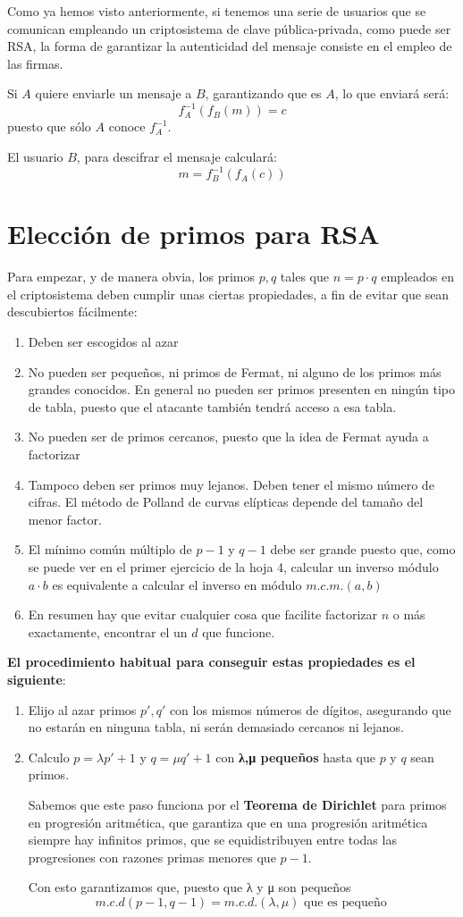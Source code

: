 Como ya hemos visto anteriormente, si tenemos una serie de usuarios que se comunican empleando un criptosistema de clave pública-privada, como puede ser RSA, la forma de garantizar la autenticidad del mensaje consiste en el empleo de las firmas.

Si $A$ quiere enviarle un mensaje a $B$, garantizando que es $A$, lo que enviará será:
\[f_A^{-1}\left(f_B(m)\right) = c\]
puesto que sólo $A$ conoce $f^{-1}_A$.

El usuario $B$, para descifrar el mensaje calculará:
\[m = f_B^{-1}\left(f_A(c)\right)\]

\section{Elección de primos para RSA}

Para empezar, y de manera obvia, los primos $p,q$ tales que $n=p\cdot q$ empleados en el criptosistema deben cumplir unas ciertas propiedades, a fin de evitar que sean descubiertos fácilmente:
\begin{enumerate}
\item Deben ser escogidos al azar
\item No pueden ser pequeños, ni primos de Fermat, ni alguno de los primos más grandes conocidos. En general no pueden ser primos presenten en ningún tipo de tabla, puesto que el atacante también tendrá acceso a esa tabla.
\item No pueden ser de primos cercanos, puesto que la idea de Fermat ayuda a factorizar
\item Tampoco deben ser primos muy lejanos. Deben tener el mismo número de cifras. El método de Polland de curvas elípticas depende del tamaño del menor factor.
\item El mínimo común múltiplo de $p-1$ y $q-1$ debe ser grande puesto que, como se puede ver en el primer ejercicio de la hoja 4, calcular un inverso módulo $a\cdot b$ es equivalente a calcular el inverso en módulo $m.c.m.(a,b)$
\item En resumen hay que evitar cualquier cosa que facilite factorizar $n$ o más exactamente, encontrar el un $d$ que funcione.
\end{enumerate}

\textbf{El procedimiento habitual para conseguir estas propiedades es el siguiente}:
\begin{enumerate}
\item Elijo al azar primos $p',q'$ con los mismos números de dígitos, asegurando que no estarán en ninguna tabla, ni serán demasiado cercanos ni lejanos.

\item Calculo $p=λp'+1$ y $q=μq'+1$ con \textbf{λ,μ pequeños} hasta que $p$ y $q$ sean primos.

Sabemos que este paso funciona por el \textbf{Teorema de Dirichlet} para primos en progresión aritmética, que garantiza que en una progresión aritmética siempre hay infinitos primos, que se equidistribuyen entre todas las progresiones con razones primas menores que $p-1$.

Con esto garantizamos que, puesto que λ y μ son pequeños
\[m.c.d(p-1,q-1) = m.c.d.(λ,μ) \text{ que es pequeño }\]
\end{enumerate}


